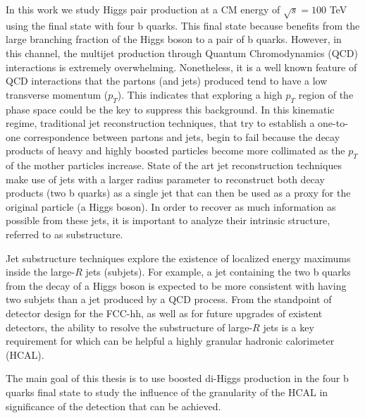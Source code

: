 In this work we study Higgs pair production at a CM energy of $\sqrt{s}=100$ TeV using the final state with four b quarks. This final state because benefits from the large branching fraction of the Higgs boson to a pair of b quarks. However, in this channel, the multijet production through Quantum Chromodynamics (QCD) interactions is extremely overwhelming. Nonetheless, it is a well known feature of QCD interactions that the partons (and jets) produced tend to have a low transverse momentum ($p_T$). This indicates that exploring a high $p_T$ region of the phase space could be the key to suppress this background. In this kinematic regime, traditional jet reconstruction techniques, that try to establish a one-to-one correspondence between partons and jets, begin to fail because the decay products of heavy and highly boosted particles become more collimated as the $p_T$ of the mother particles increase. State of the art jet reconstruction techniques make use of jets with a larger radius parameter to reconstruct both decay products (two b quarks) as a single jet that can then be used as a proxy for the original particle (a Higgs boson). In order to recover as much information as possible from these jets, it is important to analyze their intrinsic structure, referred to as substructure. 

Jet substructure techniques explore the existence of localized energy maximums inside the large-$R$ jets (subjets). For example, a jet containing the two b quarks from the decay of a Higgs boson is expected to be more consistent with having two subjets than a jet produced by a QCD process. From the standpoint of detector design for the FCC-hh, as well as for future upgrades of existent detectors, the ability to resolve the substructure of large-$R$ jets is a key requirement for which can be helpful a highly granular hadronic calorimeter (HCAL).

The main goal of this thesis is to use boosted di-Higgs production in the four b quarks final state to study the influence of the granularity of the HCAL in significance of the detection that can be achieved.


